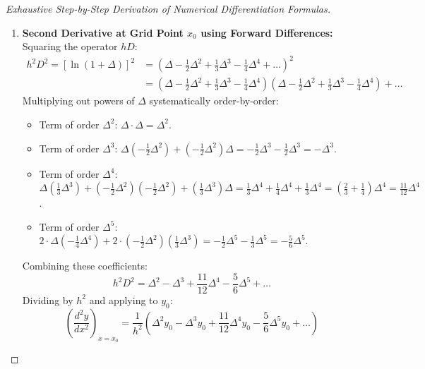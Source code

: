 \begin{proof}[Exhaustive Step-by-Step Derivation of Numerical Differentiation Formulas]
\begin{enumerate}
    \item \textbf{Second Derivative at Grid Point $x_0$ using Forward Differences:} \\
    Squaring the operator $h D$:
    \begin{align}
        h^2 D^2 = [\ln(1 + \Delta)]^2 &= \left( \Delta - \frac{1}{2}\Delta^2 + \frac{1}{3}\Delta^3 - \frac{1}{4}\Delta^4 + \dots \right)^2 \nonumber \\
        &= \left( \Delta - \frac{1}{2}\Delta^2 + \frac{1}{3}\Delta^3 - \frac{1}{4}\Delta^4 \right) \left( \Delta - \frac{1}{2}\Delta^2 + \frac{1}{3}\Delta^3 - \frac{1}{4}\Delta^4 \right) + \dots
    \end{align}
    Multiplying out powers of $\Delta$ systematically order-by-order:
    \begin{itemize}[noitemsep]
        \item Term of order $\Delta^2$: $\Delta \cdot \Delta = \Delta^2$.
        \item Term of order $\Delta^3$: $\Delta\left(-\frac{1}{2}\Delta^2\right) + \left(-\frac{1}{2}\Delta^2\right)\Delta = -\frac{1}{2}\Delta^3 - \frac{1}{2}\Delta^3 = -\Delta^3$.
        \item Term of order $\Delta^4$: $\Delta\left(\frac{1}{3}\Delta^3\right) + \left(-\frac{1}{2}\Delta^2\right)\left(-\frac{1}{2}\Delta^2\right) + \left(\frac{1}{3}\Delta^3\right)\Delta = \frac{1}{3}\Delta^4 + \frac{1}{4}\Delta^4 + \frac{1}{3}\Delta^4 = \left(\frac{2}{3} + \frac{1}{4}\right)\Delta^4 = \frac{11}{12}\Delta^4$.
        \item Term of order $\Delta^5$: $2 \cdot \Delta \left(-\frac{1}{4}\Delta^4\right) + 2 \cdot \left(-\frac{1}{2}\Delta^2\right)\left(\frac{1}{3}\Delta^3\right) = -\frac{1}{2}\Delta^5 - \frac{1}{3}\Delta^5 = -\frac{5}{6}\Delta^5$.
    \end{itemize}
    Combining these coefficients:
    \begin{equation}
        h^2 D^2 = \Delta^2 - \Delta^3 + \frac{11}{12}\Delta^4 - \frac{5}{6}\Delta^5 + \dots
    \end{equation}
    Dividing by $h^2$ and applying to $y_0$:
    \begin{equation}
        \boxed{\left(\frac{d^2 y}{dx^2}\right)_{x=x_0} = \frac{1}{h^2}\left( \Delta^2 y_0 - \Delta^3 y_0 + \frac{11}{12}\Delta^4 y_0 - \frac{5}{6}\Delta^5 y_0 + \dots \right)}
    \end{equation}
    

\end{enumerate}
\end{proof}
